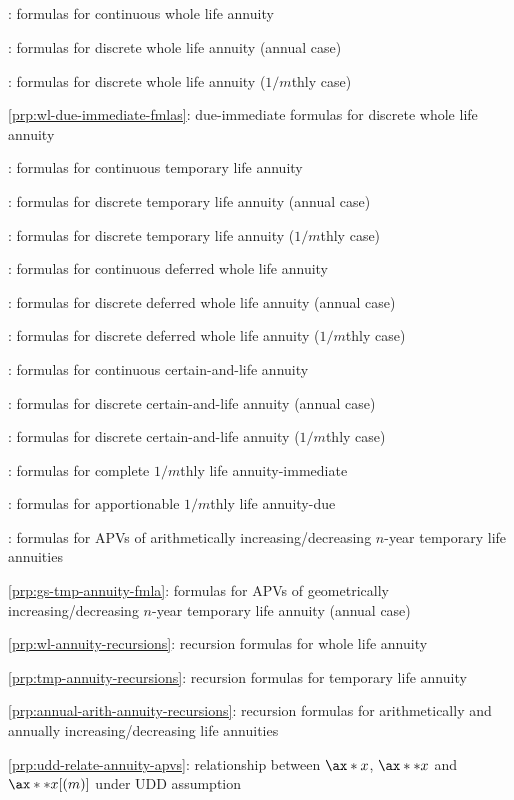 \subsection*{}
\item {}: formulas for continuous whole life annuity
\item {}: formulas for discrete whole life annuity (annual case)
\item {}: formulas for discrete whole life annuity (\(1/m\)thly case)
\item \cref{prp:wl-due-immediate-fmlas}: due-immediate formulas for discrete whole life annuity
\item {}: formulas for continuous temporary life annuity
\item {}: formulas for discrete temporary life annuity (annual case)
\item {}: formulas for discrete temporary life annuity (\(1/m\)thly case)
\item {}: formulas for continuous deferred whole life annuity
\item {}: formulas for discrete deferred whole life annuity (annual case)
\item {}: formulas for discrete deferred whole life annuity (\(1/m\)thly case)
\item {}: formulas for continuous certain-and-life annuity
\item {}: formulas for discrete certain-and-life annuity (annual case)
\item {}: formulas for discrete certain-and-life annuity (\(1/m\)thly case)
\item {}: formulas for complete \(1/m\)thly life annuity-immediate
\item {}: formulas for apportionable \(1/m\)thly life annuity-due
\item {}: formulas for APVs of arithmetically increasing/decreasing \(n\)-year temporary life annuities
\item \cref{prp:gs-tmp-annuity-fmla}: formulas for APVs of geometrically increasing/decreasing \(n\)-year temporary life annuity (annual case)
\item \cref{prp:wl-annuity-recursions}: recursion formulas for whole life annuity
\item \cref{prp:tmp-annuity-recursions}: recursion formulas for temporary life annuity
\item \cref{prp:annual-arith-annuity-recursions}: recursion formulas for arithmetically and annually increasing/decreasing life annuities
\item \cref{prp:udd-relate-annuity-apvs}: relationship between \(\ax*{x}\), \(\ax**{x}\) and \(\ax**{x}[(m)]\) under UDD assumption
